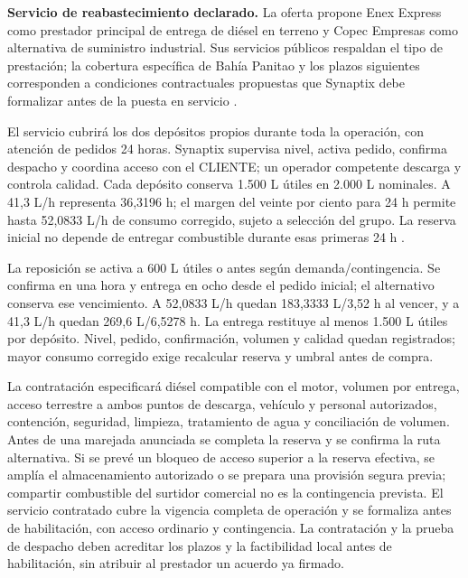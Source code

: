 \textbf{Servicio de reabastecimiento declarado.} La oferta propone Enex Express como prestador principal de entrega de diésel en terreno y Copec Empresas como alternativa de suministro industrial. Sus servicios públicos respaldan el tipo de prestación; la cobertura específica de Bahía Panitao y los plazos siguientes corresponden a condiciones contractuales propuestas que Synaptix debe formalizar antes de la puesta en servicio \parencites{p6-enex-express}{p6-copec-industrial}.

El servicio cubrirá los dos depósitos propios durante toda la operación, con atención de pedidos 24 horas. Synaptix supervisa nivel, activa pedido, confirma despacho y coordina acceso con el CLIENTE; un operador competente descarga y controla calidad. Cada depósito conserva 1.500 L útiles en 2.000 L nominales. A 41,3 L/h representa 36,3196 h; el margen del veinte por ciento para 24 h permite hasta 52,0833 L/h de consumo corregido, sujeto a selección del grupo. La reserva inicial no depende de entregar combustible durante esas primeras 24 h \parencite{p7-fg-p200-ficha}.

La reposición se activa a 600 L útiles o antes según demanda/contingencia. Se confirma en una hora y entrega en ocho desde el pedido inicial; el alternativo conserva ese vencimiento. A 52,0833 L/h quedan 183,3333 L/3,52 h al vencer, y a 41,3 L/h quedan 269,6 L/6,5278 h. La entrega restituye al menos 1.500 L útiles por depósito. Nivel, pedido, confirmación, volumen y calidad quedan registrados; mayor consumo corregido exige recalcular reserva y umbral antes de compra.

La contratación especificará diésel compatible con el motor, volumen por entrega, acceso terrestre a ambos puntos de descarga, vehículo y personal autorizados, contención, seguridad, limpieza, tratamiento de agua y conciliación de volumen. Antes de una marejada anunciada se completa la reserva y se confirma la ruta alternativa. Si se prevé un bloqueo de acceso superior a la reserva efectiva, se amplía el almacenamiento autorizado o se prepara una provisión segura previa; compartir combustible del surtidor comercial no es la contingencia prevista. El servicio contratado cubre la vigencia completa de operación y se formaliza antes de habilitación, con acceso ordinario y contingencia. La contratación y la prueba de despacho deben acreditar los plazos y la factibilidad local antes de habilitación, sin atribuir al prestador un acuerdo ya firmado.

